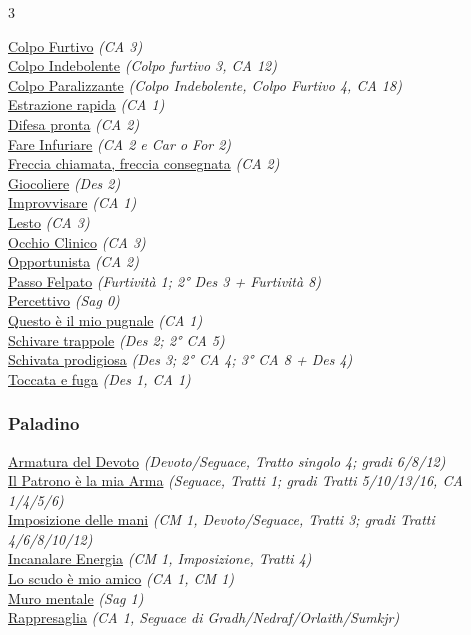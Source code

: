 \begin{multicols}{3}
{\begin{flushleft}
\hyperlink{Colpo Furtivo}{Colpo Furtivo} \textit{(CA 3)}\\
\hyperlink{Colpo Indebolente}{Colpo Indebolente} \textit{(Colpo furtivo 3, CA 12)}\\
\hyperlink{Colpo Paralizzante}{Colpo Paralizzante} \textit{(Colpo Indebolente, Colpo Furtivo 4, CA 18)}\\
\hyperlink{Estrazione rapida}{Estrazione rapida} \textit{(CA 1)}\\
\hyperlink{Difesa pronta}{Difesa pronta} \textit{(CA 2)}\\
\hyperlink{Fare Infuriare}{Fare Infuriare} \textit{(CA 2 e Car o For 2)}\\
\hyperlink{Freccia chiamata, freccia consegnata}{Freccia chiamata, freccia consegnata} \textit{(CA 2)}\\
\hyperlink{Giocoliere}{Giocoliere} \textit{(Des 2)}\\
\hyperlink{Improvvisare}{Improvvisare} \textit{(CA 1)}\\
\hyperlink{Lesto}{Lesto} \textit{(CA 3)}\\
\hyperlink{Occhio Clinico}{Occhio Clinico} \textit{(CA 3)}\\
\hyperlink{Opportunista}{Opportunista} \textit{(CA 2)}\\
\hyperlink{Passo Felpato}{Passo Felpato} \textit{(Furtività 1; 2° Des 3 + Furtività 8)}\\
\hyperlink{Percettivo}{Percettivo} \textit{(Sag 0)}\\
\hyperlink{Questo è il mio pugnale}{Questo è il mio pugnale} \textit{(CA 1)}\\
\hyperlink{Schivare trappole}{Schivare trappole} \textit{(Des 2; 2° CA 5)}\\
\hyperlink{Schivata prodigiosa}{Schivata prodigiosa} \textit{(Des 3; 2° CA 4; 3° CA 8 + Des 4)}\\
\hyperlink{Toccata e fuga}{Toccata e fuga} \textit{(Des 1, CA 1)}\\

\subsubsection*{Paladino}

\hyperlink{Armatura del Devoto}{Armatura del Devoto} \textit{(Devoto/Seguace, Tratto singolo 4; gradi 6/8/12)}\\
\hyperlink{Il Patrono è la mia Arma}{Il Patrono è la mia Arma} \textit{(Seguace, Tratti 1; gradi Tratti 5/10/13/16, CA 1/4/5/6)}\\
\hyperlink{Imposizione delle mani}{Imposizione delle mani} \textit{(CM 1, Devoto/Seguace, Tratti 3; gradi Tratti 4/6/8/10/12)}\\
\hyperlink{Incanalare Energia}{Incanalare Energia} \textit{(CM 1, Imposizione, Tratti 4)}\\
\hyperlink{Lo scudo è mio amico}{Lo scudo è mio amico} \textit{(CA 1, CM 1)}\\
\hyperlink{Muro mentale}{Muro mentale} \textit{(Sag 1)}\\
\hyperlink{Rappresaglia}{Rappresaglia} \textit{(CA 1, Seguace di Gradh/Nedraf/Orlaith/Sumkjr)}\\


\end{flushleft}}
\end{multicols}

